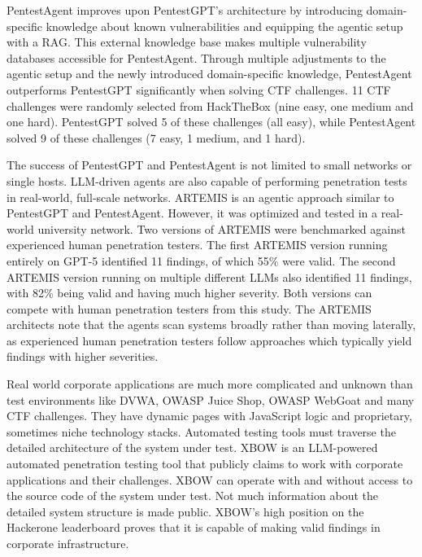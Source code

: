 PentestAgent improves upon PentestGPT's architecture by introducing domain-specific knowledge about known vulnerabilities and equipping the agentic setup with a \ac{RAG}. This external knowledge base makes multiple vulnerability databases accessible for PentestAgent. Through multiple adjustments to the agentic setup and the newly introduced domain-specific knowledge, PentestAgent outperforms PentestGPT significantly when solving \ac{CTF} challenges. 11 \ac{CTF} challenges were randomly selected from HackTheBox (nine easy, one medium and one hard). PentestGPT solved 5 of these challenges (all easy), while PentestAgent solved 9 of these challenges (7 easy, 1 medium, and 1 hard). \cite{Shen_2025}


The success of PentestGPT and PentestAgent is not limited to small networks or single hosts. \ac{LLM}-driven agents are also capable of performing penetration tests in real-world, full-scale networks. ARTEMIS is an agentic approach similar to PentestGPT and PentestAgent. However, it was optimized and tested in a real-world university network. Two versions of ARTEMIS were benchmarked against experienced human penetration testers. The first ARTEMIS version running entirely on GPT-5 identified 11 findings, of which 55\% were valid. The second ARTEMIS version running on multiple different \ac{LLM}s also identified 11 findings, with 82\% being valid and having much higher severity. Both versions can compete with human penetration testers from this study. The ARTEMIS architects note that the agents scan systems broadly rather than moving laterally, as experienced human penetration testers follow approaches which typically yield findings with higher severities. \cite{Lin_2025}

Real world corporate applications are much more complicated and unknown than test environments like DVWA, OWASP Juice Shop, OWASP WebGoat and many \ac{CTF} challenges. They have dynamic pages with JavaScript logic and proprietary, sometimes niche technology stacks. Automated testing tools must traverse the detailed architecture of the system under test. XBOW is an \ac{LLM}-powered automated penetration testing tool that publicly claims to work with corporate applications and their challenges. XBOW can operate with and without access to the source code of the system under test. \cite{xbow2026} Not much information about the detailed system structure is made public. XBOW's high position on the Hackerone leaderboard proves that it is capable of making valid findings in corporate infrastructure. \cite{hackerone_leaderboard} \cite{xbow_hype}

